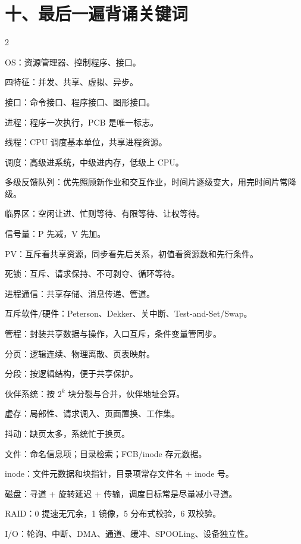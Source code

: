 \section*{十、最后一遍背诵关键词}
{}
\begin{multicols}{2}
\begin{points}
  \item OS：资源管理器、控制程序、接口。
  \item 四特征：并发、共享、虚拟、异步。
  \item 接口：命令接口、程序接口、图形接口。
  \item 进程：程序一次执行，PCB 是唯一标志。
  \item 线程：CPU 调度基本单位，共享进程资源。
  \item 调度：高级进系统，中级进内存，低级上 CPU。
  \item 多级反馈队列：优先照顾新作业和交互作业，时间片逐级变大，用完时间片常降级。
  \item 临界区：空闲让进、忙则等待、有限等待、让权等待。
  \item 信号量：P 先减，V 先加。
  \item PV：互斥看共享资源，同步看先后关系，初值看资源数和先行条件。
  \item 死锁：互斥、请求保持、不可剥夺、循环等待。
  \item 进程通信：共享存储、消息传递、管道。
  \item 互斥软件/硬件：Peterson、Dekker、关中断、Test-and-Set/Swap。
  \item 管程：封装共享数据与操作，入口互斥，条件变量管同步。
  \item 分页：逻辑连续、物理离散、页表映射。
  \item 分段：按逻辑结构，便于共享保护。
  \item 伙伴系统：按 $2^k$ 块分裂与合并，伙伴地址会算。
  \item 虚存：局部性、请求调入、页面置换、工作集。
  \item 抖动：缺页太多，系统忙于换页。
  \item 文件：命名信息项；目录检索；FCB/inode 存元数据。
  \item inode：文件元数据和块指针，目录项常存文件名 + inode 号。
  \item 磁盘：寻道 + 旋转延迟 + 传输，调度目标常是尽量减小寻道。
  \item RAID：0 提速无冗余，1 镜像，5 分布式校验，6 双校验。
  \item I/O：轮询、中断、DMA、通道、缓冲、SPOOLing、设备独立性。
\end{points}
\end{multicols}
